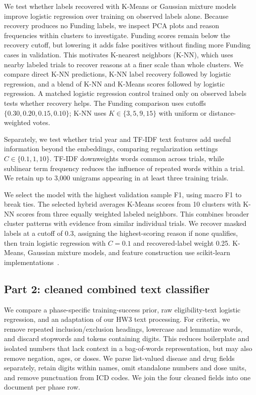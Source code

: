 \documentclass[10pt,twocolumn,letterpaper]{article}
\begin{document}
We test whether labels recovered with K-Means or Gaussian mixture models improve
logistic regression over training on observed labels alone. Because recovery
produces no Funding labels, we inspect PCA plots and reason frequencies within
clusters to investigate. Funding scores remain below the recovery cutoff, but
lowering it adds false positives without finding more Funding cases in validation.
This motivates K-nearest neighbors (K-NN), which uses nearby labeled trials to
recover reasons at a finer scale than whole clusters. We compare direct K-NN
predictions, K-NN label recovery followed by logistic regression, and a blend of
K-NN and K-Means scores followed by logistic regression. A matched logistic
regression control trained only on observed labels tests whether recovery helps.
The Funding comparison uses cutoffs $\{0.30,0.20,0.15,0.10\}$; K-NN uses
$K\in\{3,5,9,15\}$ with uniform or distance-weighted votes.

Separately, we test whether trial year and TF-IDF text features add useful
information beyond the embeddings, comparing regularization settings
$C\in\{0.1,1,10\}$. TF-IDF downweights words common across trials, while
sublinear term frequency reduces the influence of repeated words within a trial.
We retain up to 3,000 unigrams appearing in at least three training trials.

We select the model with the highest validation sample F1, using macro F1 to
break ties. The selected hybrid averages K-Means scores from 10 clusters with
K-NN scores from three equally weighted labeled neighbors. This combines broader
cluster patterns with evidence from similar individual trials. We recover masked
labels at a cutoff of 0.3, assigning the highest-scoring reason if none qualifies,
then train logistic regression with $C=0.1$ and recovered-label weight 0.25.
K-Means, Gaussian mixture models, and feature construction use scikit-learn
implementations~\cite{clustering,tfidf}.

\subsection{Part 2: cleaned combined text classifier}
We compare a phase-specific training-success prior, raw eligibility-text
logistic regression, and an adaptation of our HW3 text processing. For criteria,
we remove repeated inclusion/exclusion headings, lowercase and lemmatize words,
and discard stopwords and tokens containing digits. This reduces boilerplate
and isolated numbers that lack context in a bag-of-words representation, but
may also remove negation, ages, or doses. We parse list-valued disease and drug
fields separately, retain digits within names, omit standalone numbers and dose
units, and remove punctuation from ICD codes. We join the four cleaned fields
into one document per phase row.
\end{document}
